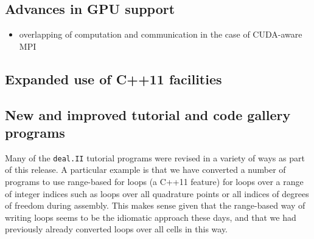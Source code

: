 \documentclass{ansarticle-preprint}
\newcommand{\specialword}[1]{\texttt{#1}}
\newcommand{\dealii}{{\specialword{deal.II}}\xspace}
\begin{document}
\subsection{Advances in GPU support}
\label{subsec:gpu}

\begin{itemize}
\item overlapping of computation and communication in the case of CUDA-aware MPI
\end{itemize}


\subsection{Expanded use of C++11 facilities}
\label{subsec:cxx}




\subsection{New and improved tutorial and code gallery programs}
\label{subsec:steps}

Many of the \dealii{} tutorial programs were revised in a variety of
ways as part of this release. A particular example is that we have
converted a number of programs to use range-based for loops (a C++11
feature) for loops over a range of integer indices such as loops over
all quadrature points or all indices of degrees of freedom during
assembly. This makes sense given that the
range-based way of writing loops seems to be the idiomatic approach
these days, and that we had previously already converted loops over
all cells in this way.
\end{document}
